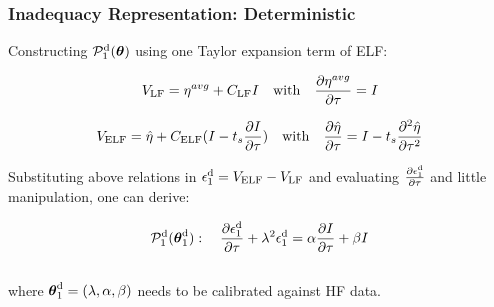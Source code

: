 \documentclass[10pt,xcolor=dvipsnames,compress]{beamer}
\begin{document}
\begin{frame}
\frametitle{Inadequacy Representation: Deterministic}
\vfill


Constructing $\mathcal{P}_1^{\rm d}(\boldsymbol{\theta})$ using one Taylor expansion term of ELF: 

\begin{equation*}
V_{\rm LF} = {\eta}^{avg} + C_{\rm LF} I
\quad {\rm with} \quad 
\frac{\partial{{\eta}^{avg}}}{\partial\tau} = I
\end{equation*}

\begin{equation*}
V_{\rm ELF} = \hat{\eta} + C_{\rm ELF} (
I - t_s \frac{\partial I}{\partial \tau}
)
\quad {\rm with} \quad 
\frac{\partial{\hat{\eta}}}{\partial\tau} = I - t_s  \frac{\partial^2{\hat{\eta}}}{\partial\tau^2}
\end{equation*}

Substituting above relations in $\epsilon_1^{\rm d} = V_{\rm ELF}- V_{\rm LF}$ and evaluating $\frac{\partial\epsilon_1^{\rm d}}{\partial\tau}$ and little manipulation, one can derive:

\begin{block}{}

\begin{equation*}
\mathcal{P}_1^{\rm d}(\boldsymbol{\theta}_1^{\rm d}) : \quad
\frac{\partial\epsilon_1^{\rm d}}{\partial\tau} + \lambda^2\epsilon_1^{\rm d} = \alpha \frac{\partial I}{\partial\tau} + \beta I
\end{equation*}
\\where $
\boldsymbol{\theta}_1^{\rm d}=
(\lambda, \alpha, \beta)
$ needs to be calibrated against HF data.

\end{block}

\vfill
\end{frame}
\end{document}

